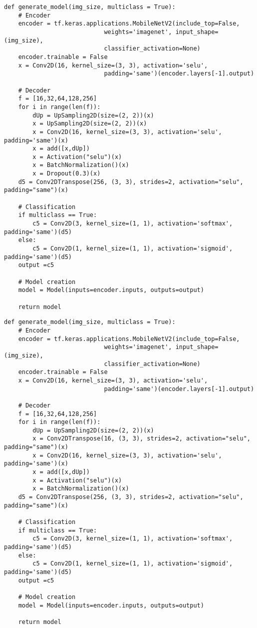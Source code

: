 \newpage
\begin{lstlisting}[caption={Advanced Decoder with Upsampling},captionpos=b, label={lst:Decoder-Upsampling}]
def generate_model(img_size, multiclass = True):
    # Encoder
    encoder = tf.keras.applications.MobileNetV2(include_top=False, 
                            weights='imagenet', input_shape=(img_size),
                            classifier_activation=None)
    encoder.trainable = False
    x = Conv2D(16, kernel_size=(3, 3), activation='selu',
                            padding='same')(encoder.layers[-1].output)
    
    # Decoder
    f = [16,32,64,128,256]
    for i in range(len(f)):
        dUp = UpSampling2D(size=(2, 2))(x)
        x = UpSampling2D(size=(2, 2))(x)
        x = Conv2D(16, kernel_size=(3, 3), activation='selu', padding='same')(x)
        x = add([x,dUp])
        x = Activation("selu")(x)
        x = BatchNormalization()(x)
        x = Dropout(0.3)(x)
    d5 = Conv2DTranspose(256, (3, 3), strides=2, activation="selu", padding="same")(x)
    
    # Classification
    if multiclass == True:
        c5 = Conv2D(3, kernel_size=(1, 1), activation='softmax', padding='same')(d5)
    else:
        c5 = Conv2D(1, kernel_size=(1, 1), activation='sigmoid', padding='same')(d5)
    output =c5
    
    # Model creation
    model = Model(inputs=encoder.inputs, outputs=output)
    
    return model
\end{lstlisting}
\newpage
\begin{lstlisting}[caption={Advanced Decoder with Transposed Layer},captionpos=b, label={lst:Decoder-Transpose}]
def generate_model(img_size, multiclass = True):
    # Encoder
    encoder = tf.keras.applications.MobileNetV2(include_top=False, 
                            weights='imagenet', input_shape=(img_size),
                            classifier_activation=None)
    encoder.trainable = False
    x = Conv2D(16, kernel_size=(3, 3), activation='selu',
                            padding='same')(encoder.layers[-1].output)
    
    # Decoder
    f = [16,32,64,128,256]
    for i in range(len(f)):
        dUp = UpSampling2D(size=(2, 2))(x)
        x = Conv2DTranspose(16, (3, 3), strides=2, activation="selu", padding="same")(x)
        x = Conv2D(16, kernel_size=(3, 3), activation='selu', padding='same')(x)
        x = add([x,dUp])
        x = Activation("selu")(x)
        x = BatchNormalization()(x)
    d5 = Conv2DTranspose(256, (3, 3), strides=2, activation="selu", padding="same")(x)
    
    # Classification
    if multiclass == True:
        c5 = Conv2D(3, kernel_size=(1, 1), activation='softmax', padding='same')(d5)
    else:
        c5 = Conv2D(1, kernel_size=(1, 1), activation='sigmoid', padding='same')(d5)
    output =c5
    
    # Model creation
    model = Model(inputs=encoder.inputs, outputs=output)
    
    return model
\end{lstlisting}
